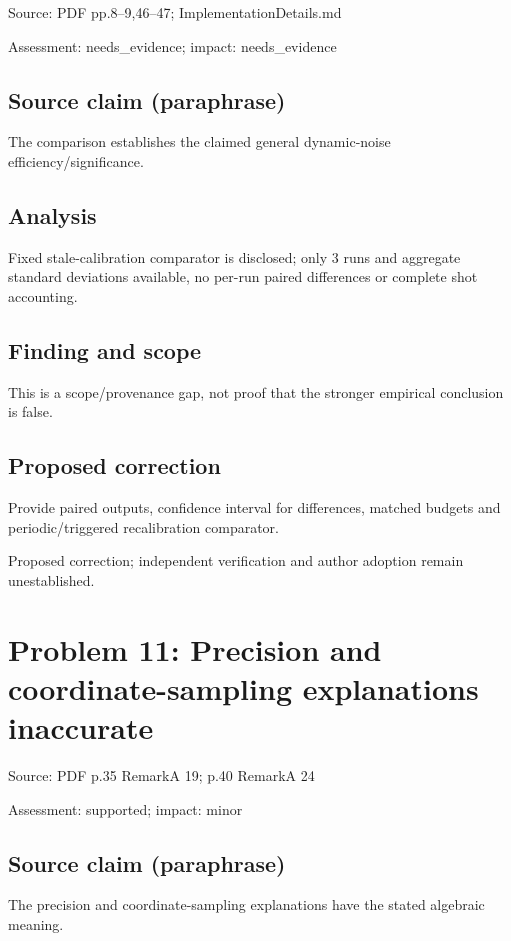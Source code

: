 \documentclass[11pt]{article}
\begin{document}
Source: PDF pp.8–9,46–47; ImplementationDetails.md

Assessment: needs\_evidence; impact: needs\_evidence

\subsection*{Source claim (paraphrase)}

The comparison establishes the claimed general dynamic-noise efficiency/significance.

\subsection*{Analysis}

Fixed stale-calibration comparator is disclosed; only \(3\) runs and aggregate standard deviations available, no per-run paired differences or complete shot accounting.

\subsection*{Finding and scope}

This is a scope/provenance gap, not proof that the stronger empirical conclusion is false.

\subsection*{Proposed correction}

Provide paired outputs, confidence interval for differences, matched budgets and periodic/triggered recalibration comparator.

Proposed correction; independent verification and author adoption remain unestablished.

\section*{Problem 11: Precision and coordinate-sampling explanations inaccurate}

Source: PDF p.35 RemarkA 19; p.40 RemarkA 24

Assessment: supported; impact: minor

\subsection*{Source claim (paraphrase)}

The precision and coordinate-sampling explanations have the stated algebraic meaning.
\end{document}
